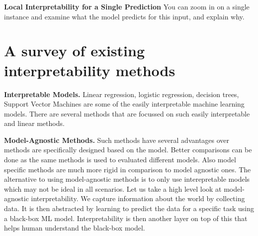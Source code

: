 \documentclass{../template/texnote}
\begin{document}
\textbf{Local Interpretability for a Single Prediction}
You can zoom in on a single instance and examine what the model predicts for this input, and explain why.


\section{A survey of existing interpretability methods}
\textbf{Interpretable Models.} Linear regression, logistic regression, decision trees, Support Vector Machines are some of the easily interpretable machine learning models.
There are several methods that are focussed on such easily interpretable and linear methods.


\textbf{Model-Agnostic Methods.} Such methods have several advantages over methods are specifically designed based on the model. Better comparisons can be done as the same methods 
is used to evaluated different models. Also model specific methods are much more rigid in comparison to model agnostic ones.
The alternative to using model-agnostic methods is to only use interepretable models which may not be ideal in all scenarios.
Let us take a high level look at model-agnostic interpretability.
We capture information about the world by collecting data. 
It is then abstracted by learning to predict the data for a specific task using a black-box ML model.
Interpretability is then another layer on top of this that helps human understand the black-box model.
\end{document}
